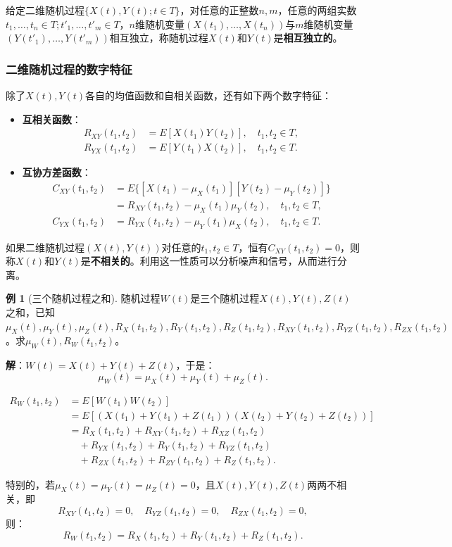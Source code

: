 \documentclass[11pt,a4paper]{report}
\theoremstyle{definition}
\newtheorem{example}{例}[chapter]
\begin{document}
给定二维随机过程$\{X(t),Y(t);t\in T\}$，对任意的正整数$n,m$，任意的两组实数$t_1,\ldots,t_n\in T;t'_1,\ldots,t'_m\in T$，$n$维随机变量$(X(t_1),\ldots,X(t_n))$与$m$维随机变量$(Y(t'_1),\ldots,Y(t'_m))$相互独立，称随机过程$X(t)$和$Y(t)$是\textbf{相互独立的}。

\subsubsection{二维随机过程的数字特征}

除了$X(t),Y(t)$各自的均值函数和自相关函数，还有如下两个数字特征：

\begin{itemize}[leftmargin=2em]
    \item \textbf{互相关函数}：
    \begin{align*}
    R_{XY}(t_1,t_2)&=E[X(t_1)Y(t_2)],\quad t_1,t_2\in T,\\
    R_{YX}(t_1,t_2)&=E[Y(t_1)X(t_2)],\quad t_1,t_2\in T.
    \end{align*}
    \item \textbf{互协方差函数}：
    \begin{align*}
    C_{XY}(t_1,t_2)&=E\{[X(t_1)-\mu_X(t_1)][Y(t_2)-\mu_Y(t_2)]\}\\
    &=R_{XY}(t_1,t_2)-\mu_X(t_1)\mu_Y(t_2),\quad t_1,t_2\in T,\\
    C_{YX}(t_1,t_2)&=R_{YX}(t_1,t_2)-\mu_Y(t_1)\mu_X(t_2),\quad t_1,t_2\in T.
    \end{align*}
\end{itemize}

如果二维随机过程$(X(t),Y(t))$对任意的$t_1,t_2\in T$，恒有$C_{XY}(t_1,t_2)=0$，则称$X(t)$和$Y(t)$是\textbf{不相关的}。利用这一性质可以分析噪声和信号，从而进行分离。

\begin{example}[三个随机过程之和]
随机过程$W(t)$是三个随机过程$X(t),Y(t),Z(t)$之和，已知$\mu_X(t),\mu_Y(t),\mu_Z(t),R_X(t_1,t_2),R_Y(t_1,t_2),R_Z(t_1,t_2),R_{XY}(t_1,t_2),R_{YZ}(t_1,t_2),R_{ZX}(t_1,t_2)$。求$\mu_W(t),R_W(t_1,t_2)$。

\textbf{解}：$W(t)=X(t)+Y(t)+Z(t)$，于是：
\[
\mu_W(t)=\mu_X(t)+\mu_Y(t)+\mu_Z(t).
\]

\begin{align*}
R_W(t_1,t_2)&=E[W(t_1)W(t_2)]\\
&=E[(X(t_1)+Y(t_1)+Z(t_1))(X(t_2)+Y(t_2)+Z(t_2))]\\
&=R_X(t_1,t_2)+R_{XY}(t_1,t_2)+R_{XZ}(t_1,t_2)\\
&\quad+R_{YX}(t_1,t_2)+R_Y(t_1,t_2)+R_{YZ}(t_1,t_2)\\
&\quad+R_{ZX}(t_1,t_2)+R_{ZY}(t_1,t_2)+R_Z(t_1,t_2).
\end{align*}

特别的，若$\mu_X(t)=\mu_Y(t)=\mu_Z(t)=0$，且$X(t),Y(t),Z(t)$两两不相关，即
\[
R_{XY}(t_1,t_2)=0,\quad R_{YZ}(t_1,t_2)=0,\quad R_{ZX}(t_1,t_2)=0,
\]
则：
\[
R_W(t_1,t_2)=R_X(t_1,t_2)+R_Y(t_1,t_2)+R_Z(t_1,t_2).
\]
\end{example}
\end{document}
